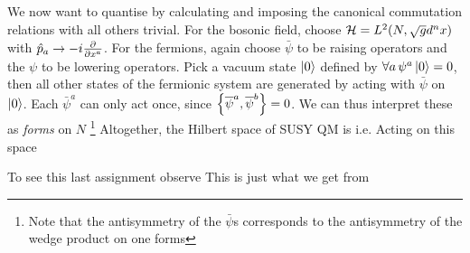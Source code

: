 \documentclass{article}
\begin{document}
We now want to quantise by calculating
and imposing the  canonical commutation relations
with all others trivial. For the bosonic field, choose $\mc{H} = L^2(N, \sqrt{g}d^n x )$ with $\hat{p}_a \to -i \pd{x^a}$. For the fermions, again choose $\bar{\psi}$ to be raising operators and the $\psi$ to be lowering operators. Pick a vacuum state $\ket{0}$ defined by $\forall a \, \psi^a \ket{0}=0$, then all other states of the fermionic system are generated by acting with $\bar{\psi}$ on $\ket{0}$. Each $\bar{\psi}^a$ can only act once, since $\acomm[\bar{\psi}^a]{\bar{\psi}^b}=0$. We can thus interpret these as \emph{forms} on $N$ 
\footnote{Note that the antisymmetry of the $\bar{\psi}$s corresponds to the antisymmetry of the wedge product on one forms}
Altogether, the Hilbert space of SUSY QM is 
i.e. 
Acting on this space 
\begin{remark}
To see this last assignment observe
This is just what we get from  
\end{remark}
\end{document}
